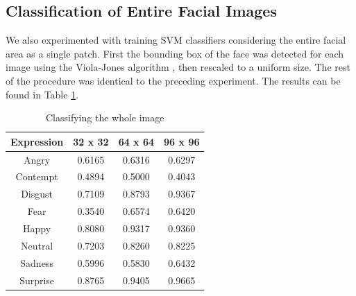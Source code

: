 \subsection{Classification of Entire Facial Images}\label{sec:experiments:face}
We also experimented with training SVM classifiers considering the entire facial area as a single patch. First the bounding box of the face was detected
for each image using the Viola-Jones algorithm \cite{Viola01}, then rescaled to a uniform size. %
The rest of the procedure was identical to the preceding experiment. The results can be found in Table \ref{table:entire_images}.

\begin{table}
\begin{tabular}{| c | c | c | c |}
\hline
Expression & 32 x 32 &  64 x 64  & 96 x 96  \\

\hline
Angry	 & 0.6165 & 0.6316 & 0.6297	\\
Contempt & 0.4894 & 0.5000 & 0.4043	\\
Disgust	 & 0.7109 & 0.8793 & 0.9367	\\
Fear	 & 0.3540 & 0.6574 & 0.6420	\\
Happy	 & 0.8080 & 0.9317 & 0.9360	\\
Neutral	 & 0.7203 & 0.8260 & 0.8225	\\
Sadness	 & 0.5996 & 0.5830 & 0.6432	\\
Surprise & 0.8765 & 0.9405 & 0.9665	\\

\hline
\end{tabular}
\caption{Classifying the whole image}
\label{table:entire_images}
\end{table}


